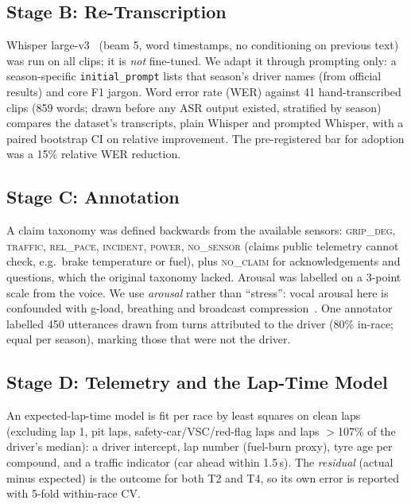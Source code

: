 \subsection{Stage B: Re-Transcription}
Whisper large-v3~\cite{radford2023whisper} (beam 5, word timestamps, no conditioning on previous text) was run on all clips; it is \emph{not} fine-tuned. We adapt it through prompting only: a season-specific \texttt{initial\_prompt} lists that season's driver names (from official results) and core F1 jargon. Word error rate (WER) against 41 hand-transcribed clips (859 words; drawn before any ASR output existed, stratified by season) compares the dataset's transcripts, plain Whisper and prompted Whisper, with a paired bootstrap CI on relative improvement. The pre-registered bar for adoption was a 15\% relative WER reduction.

\subsection{Stage C: Annotation}
A claim taxonomy was defined backwards from the available sensors: \textsc{grip\_deg}, \textsc{traffic}, \textsc{rel\_pace}, \textsc{incident}, \textsc{power}, \textsc{no\_sensor} (claims public telemetry cannot check, e.g.\ brake temperature or fuel), plus \textsc{no\_claim} for acknowledgements and questions, which the original taxonomy lacked. Arousal was labelled on a 3-point scale from the voice. We use \emph{arousal} rather than ``stress'': vocal arousal here is confounded with g-load, breathing and broadcast compression~\cite{russell1980circumplex}. One annotator labelled 450 utterances drawn from turns attributed to the driver (80\% in-race; equal per season), marking those that were not the driver.

\subsection{Stage D: Telemetry and the Lap-Time Model}
An expected-lap-time model is fit per race by least squares on clean laps (excluding lap 1, pit laps, safety-car/VSC/red-flag laps and laps $>$107\% of the driver's median): a driver intercept, lap number (fuel-burn proxy), tyre age per compound, and a traffic indicator (car ahead within 1.5\,s). The \emph{residual} (actual minus expected) is the outcome for both T2 and T4, so its own error is reported with 5-fold within-race CV.

